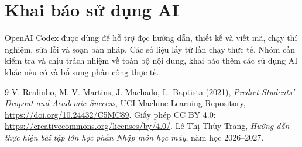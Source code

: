 \documentclass[11pt,a4paper]{article}
\begin{document}
\appendix
\section{Khai báo sử dụng AI}
OpenAI Codex được dùng để hỗ trợ đọc hướng dẫn, thiết kế và viết mã, chạy thí nghiệm, sửa lỗi và soạn bản nháp. Các số liệu lấy từ lần chạy thực tế. Nhóm cần kiểm tra và chịu trách nhiệm về toàn bộ nội dung, khai báo thêm các sử dụng AI khác nếu có và bổ sung phân công thực tế.
\begin{thebibliography}{9}
 V. Realinho, M. V. Martins, J. Machado, L. Baptista (2021), \emph{Predict Students' Dropout and Academic Success}, UCI Machine Learning Repository, \url{https://doi.org/10.24432/C5MC89}. Giấy phép CC BY 4.0: \url{https://creativecommons.org/licenses/by/4.0/}.
 Lê Thị Thùy Trang, \emph{Hướng dẫn thực hiện bài tập lớn học phần Nhập môn học máy}, năm học 2026--2027.
\end{thebibliography}
\end{document}
